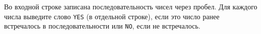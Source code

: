 \InputFile
Во входной строке записана последовательность чисел через пробел.
\OutputFile
Для каждого числа выведите слово \verb"YES" (в отдельной строке), если это число ранее встречалось в последовательности или \verb"NO", если не встречалось. 

